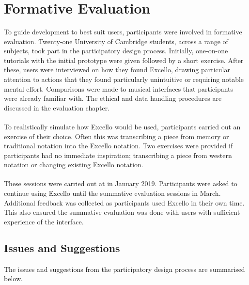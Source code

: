 \section{Formative Evaluation}

\paragraph{} To guide development to best suit users, participants were involved in formative evaluation. Twenty-one University of Cambridge students, across a range of subjects, took part in the participatory design process. Initially, one-on-one tutorials with the initial prototype were given followed by a short exercise. After these, users were interviewed on how they found Excello, drawing particular attention to actions that they found particularly unintuitive or requiring notable mental effort. Comparisons were made to musical interfaces that participants were already familiar with. The ethical and data handling procedures are discussed in the evaluation chapter.

\paragraph{} To realistically simulate how Excello would be used, participants carried out an exercise of their choice. Often this was transcribing a piece from memory or traditional notation into the Excello notation. Two exercises were provided if participants had no immediate inspiration; transcribing a piece from western notation or changing existing Excello notation.

\paragraph{} These sessions were carried out at in January 2019. Participants were asked to continue using Excello until the summative evaluation sessions in March. Additional feedback was collected as participants used Excello in their own time. This also ensured the summative evaluation was done with users with sufficient experience of the interface.

\subsection{Issues and Suggestions}

\paragraph{} The issues and suggestions from the participatory design process are summarised below.

